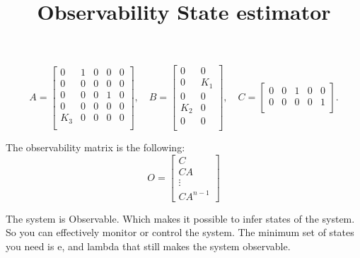 \[
A = \begin{bmatrix}
0 & 1 & 0 & 0 & 0 \\
0 & 0 & 0 & 0 & 0 \\
0 & 0 & 0 & 1 & 0 \\
0 & 0 & 0 & 0 & 0 \\
K_3 & 0 & 0 & 0 & 0 \\
\end{bmatrix}, \quad
B = \begin{bmatrix}
0 & 0 \\
0 & K_1 \\
0 & 0 \\
K_2 & 0 \\
0 & 0 \\
\end{bmatrix}, \quad
C = \begin{bmatrix}
0 & 0 & 1 & 0 & 0 \\
0 & 0 & 0 & 0 & 1 \\

\end{bmatrix}.
\]

\vspace{2em}
\noindent
\noindent
\title{\textbf{Observability}}

\maketitle
\vspace{2em}

The observability matrix is the following:
\[
O =
\begin{bmatrix}
C \\
CA \\
\vdots \\
CA^{n-1}
\end{bmatrix}
\]


\noindent
The system is Observable. Which makes it possible to infer states of the system. So you can effectively monitor or control the system.
The minimum set of states you need is e, and lambda that still makes the system observable. 


\vspace{1em}


\noindent
\title{ \textbf{State estimator}} 
\maketitle
\vspace{1em}
\vspace{1em}

